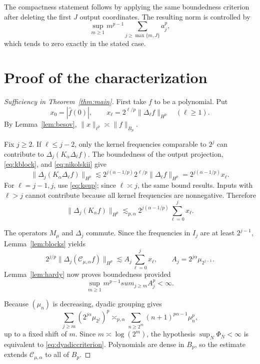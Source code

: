 \documentclass[11pt]{article}
\newcommand{\Cma}{\mathcal C_{\mu,\alpha}}
\begin{document}
The compactness statement follows by applying the same boundedness criterion
after deleting the first \(J\) output coordinates.  The resulting norm is
controlled by
\[
 \sup_{m\geq1}m^{p-1}
 \sum_{j\geq\max\{m,J\}}a_j^p,
\]
which tends to zero exactly in the stated case.

\section{Proof of the characterization}

\begin{proof}[Sufficiency in Theorem~\ref{thm:main}]
First take \(f\) to be a polynomial.  Put
\[
 x_0=|\widehat f(0)|,
 \qquad x_\ell=2^{\ell/p}\|\Delta_\ell f\|_{H^p}
 \quad(\ell\geq1).
\]
By Lemma~\ref{lem:besov}, \(\|x\|_{\ell^p}\asymp\|f\|_{B_p}\).

Fix \(j\geq2\).  If \(\ell\leq j-2\), only the kernel frequencies
comparable to \(2^j\) can contribute to
\(\Delta_j(K_\alpha\Delta_\ell f)\).  The boundedness of the output
projection, \eqref{eq:kblock}, and \eqref{eq:nikolskii} give
\[
 \|\Delta_j(K_\alpha\Delta_\ell f)\|_{H^p}
 \lesssim
 2^{j(\alpha-1/p)}
 2^{\ell/p}\|\Delta_\ell f\|_{H^p}
 =2^{j(\alpha-1/p)}x_\ell.
\]
For \(\ell=j-1,j\), use \eqref{eq:ksup}; since \(\ell\asymp j\), the same
bound results.  Inputs with \(\ell>j\) cannot contribute because all kernel
frequencies are nonnegative.  Therefore
\begin{equation}\label{eq:productupper}
 \|\Delta_j(K_\alpha f)\|_{H^p}
 \lesssim_{p,\alpha}
 2^{j(\alpha-1/p)}\sum_{\ell=0}^{j}x_\ell.
\end{equation}

The operators \(M_\mu\) and \(\Delta_j\) commute.  Since the frequencies in
\(I_j\) are at least \(2^{j-1}\), Lemma~\ref{lem:blocks} yields
\[
 2^{j/p}\|\Delta_j(\Cma f)\|_{H^p}
 \lesssim
 A_j\sum_{\ell=0}^{j}x_\ell,
 \qquad
 A_j=2^{j\alpha}\mu_{2^{j-1}}.
\]
Lemma~\ref{lem:hardy} now proves boundedness provided
\begin{equation}\label{eq:dyadiccriterion}
 \sup_{m\geq1}m^{p-1}sum_{j\geq m}A_j^p<\infty.
\end{equation}

Because \((\mu_n)\) is decreasing, dyadic grouping gives
\begin{equation}\label{eq:tails}
 \sum_{j\geq m}(2^{j\alpha}\mu_{2^j})^p
 \asymp_{p,\alpha}
 \sum_{n\geq2^m}(n+1)^{p\alpha-1}\mu_n^p,
\end{equation}
up to a fixed shift of \(m\).  Since \(m\asymp\log(2^m)\), the hypothesis
\(\sup_N\Phi_N<\infty\) is equivalent to \eqref{eq:dyadiccriterion}.
Polynomials are dense in \(B_p\), so the estimate extends \(\Cma\) to all of
\(B_p\).
\end{proof}
\end{document}
